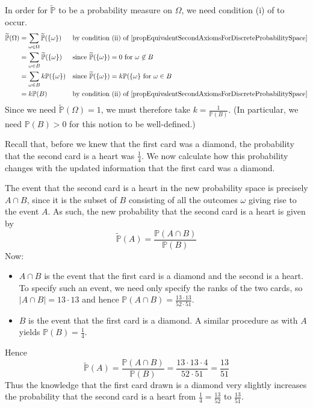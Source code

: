 \begin{example}
In order for $\widetilde{\mathbb{P}}$ to be a probability measure on $\Omega$, we need condition (i) of  to occur. 
\begin{align*}
\widetilde{\mathbb{P}}(\Omega) &= \sum_{\omega \in \Omega} \widetilde{\mathbb{P}}(\{\omega\}) && \text{by condition (ii) of \Cref{propEquivalentSecondAxiomsForDiscreteProbabilitySpace}} \\
&= \sum_{\omega \in B} \widetilde{\mathbb{P}}(\{\omega\}) && \text{since $\widetilde{\mathbb{P}}(\{\omega\})=0$ for $\omega \not \in B$} \\
&= \sum_{\omega \in B} k\mathbb{P}(\{\omega\}) && \text{since $\widetilde{\mathbb{P}}(\{\omega\})=k\mathbb{P}(\{\omega\}$ for $\omega \in B$} \\
&= k\mathbb{P}(B) && \text{by condition (ii) of \Cref{propEquivalentSecondAxiomsForDiscreteProbabilitySpace}}
\end{align*}
Since we need $\widetilde{\mathbb{P}}(\Omega)=1$, we must therefore take $k=\frac{1}{\mathbb{P}(B)}$. (In particular, we need $\mathbb{P}(B)>0$ for this notion to be well-defined.)

Recall that, before we knew that the first card was a diamond, the probability that the second card is a heart was $\frac{1}{4}$. We now calculate how this probability changes with the updated information that the first card was a diamond.

The event that the second card is a heart in the new probability space is precisely $A \cap B$, since it is the subset of $B$ consisting of all the outcomes $\omega$ giving rise to the event $A$. As such, the new probability that the second card is a heart is given by
\[ \widetilde{\mathbb{P}}(A) = \frac{\mathbb{P}(A \cap B)}{\mathbb{P}(B)} \]
Now:
\begin{itemize}
\item $A \cap B$ is the event that the first card is a diamond and the second is a heart. To specify such an event, we need only specify the ranks of the two cards, so $|A \cap B| = 13 \cdot 13$ and hence $\mathbb{P}(A \cap B) = \frac{13 \cdot 13}{52 \cdot 51}$.
\item $B$ is the event that the first card is a diamond. A similar procedure as with $A$ yields $\mathbb{P}(B) = \frac{1}{4}$. 
\end{itemize}
Hence
\[ \widetilde{\mathbb{P}}(A) = \frac{\mathbb{P}(A \cap B)}{\mathbb{P}(B)} = \frac{13 \cdot 13 \cdot 4}{52 \cdot 51} = \frac{13}{51} \]
Thus the knowledge that the first card drawn is a diamond very slightly increases the probability that the second card is a heart from $\frac{1}{4}=\frac{13}{52}$ to $\frac{13}{51}$.
\end{example}

